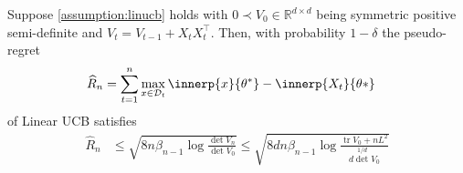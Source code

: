 \documentclass{article}
\newcommand{\Real}{\mathds{R}}
\DeclareMathOperator{\tr}{tr}
\newcommand{\transp}[1]{#1^\intercal}
\newcommand{\Dset}[1]{\mathcal{D}_{#1}}
\begin{document}
\begin{theorem}\label{thm:linucb-regret}
  Suppose \cref{assumption:linucb} holds with
  $0 \prec V_0 \in \Real^{d \times d}$ being symmetric positive
  semi-definite and $V_t = V_{t-1} + X_t\transp{X_t}$. Then, with
  probability $1-\delta$ the pseudo-regret
  \begin{align*}
    \widehat{R}_n &= \sum_{t=1}^n \max_{x\in\Dset{t}} \innerp{x}{\theta^*} - \innerp{X_t}{\theta*}
  \end{align*}
  of Linear UCB satisfies
  \begin{align*}
    \widehat{R}_n &\le \sqrt{8n\beta_{n-1} \log\frac{\det V_n}{\det V_0}}
                   \le \sqrt{8dn\beta_{n-1}\log\frac{\tr V_0 + nL^2}{d\det^{1/d} V_0}}
  \end{align*}
\end{theorem}
\end{document}
